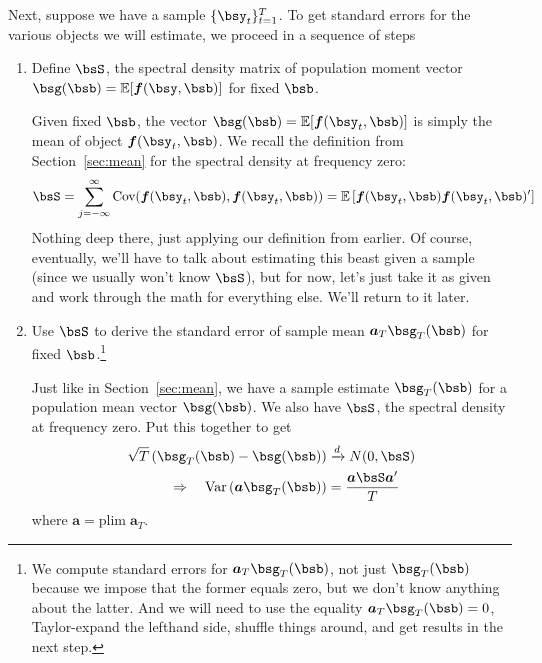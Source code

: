 \documentclass[12pt]{article}
\theoremstyle{plain}
\theoremstyle{definition}
\theoremstyle{remark}
\begin{document}
Next, suppose we have a sample $\{\bsy_t\}^T_{t=1}$. To get
standard errors for the various objects we will estimate, we proceed in
a sequence of steps
\begin{enumerate}
  \item Define $\bsS$, the spectral density matrix of
    population moment vector
    $\bsg(
    \bsb)=\mathbb{E}[\boldsymbol{f}(\bsy,
    \bsb)]$ for fixed $\bsb$.

    Given fixed $\bsb$, the vector
    $\bsg(\bsb)
    =\mathbb{E}[\boldsymbol{f}(\bsy_t,\bsb)]$
    is simply the mean of object
    $\boldsymbol{f}(\bsy_t,\bsb)$.
    We recall the definition from Section~\ref{sec:mean} for
    the spectral density at frequency zero:
    \begin{align*}
      \bsS = \sum^\infty_{j={-\infty}}
        \text{Cov}(\boldsymbol{f}(\bsy_t,\bsb),
          \boldsymbol{f}(\bsy_t,\bsb))
        =
        \mathbb{E}\left[
        \boldsymbol{f}(\bsy_t,\bsb)
        \boldsymbol{f}(\bsy_t,\bsb)'
        \right]
    \end{align*}
    Nothing deep there, just applying our definition from earlier. Of
    course, eventually, we'll have to talk about estimating this beast
    given a sample (since we usually won't know $\bsS$), but
    for now, let's just take it as given and work through the math for
    everything else. We'll return to it later.

  \item Use $\bsS$ to derive the standard error of sample mean
    $\boldsymbol{a}_T\bsg_T(\bsb)$ for fixed
    $\bsb$.\footnote{We compute standard errors for
      $\boldsymbol{a}_T\bsg_T(\bsb)$, not just
      $\bsg_T(\bsb)$ because we impose that the
      former equals zero, but we don't know anything about the latter.
      And we will need to use the equality
      $\boldsymbol{a}_T\bsg_T(\bsb)=0$,
      Taylor-expand the lefthand side, shuffle things around, and get
      results in the next step.}

    Just like in Section~\ref{sec:mean}, we have a sample estimate
    $\bsg_T(\bsb)$ for a population mean vector
    $\bsg(\bsb)$. We also have $\bsS$, the
    spectral density at frequency zero. Put this together to get
    \begin{align*}
      \sqrt{T}\left(\bsg_T(\bsb)
      - \bsg(\bsb)\right)
      &\xrightarrow{d} N(0,\bsS)\\
      \Rightarrow \quad
      \text{Var}\left(
        \boldsymbol{a}
        \bsg_T(\bsb)
      \right)
      &=
      \frac{\boldsymbol{a}\bsS\boldsymbol{a}'}{T}
    \end{align*}
    where $\boldsymbol{a}= \text{plim}\;\boldsymbol{a}_T$.


\end{enumerate}
\end{document}
